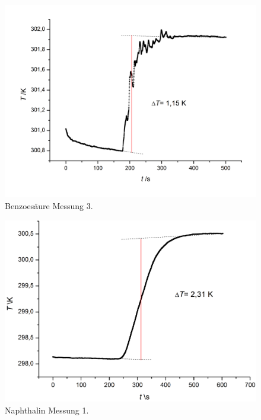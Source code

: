\documentclass[12pt,a4paper,titlepage,headinclude,bibtotoc]{scrartcl}
\begin{document}
\begin{figure} [h!]
\begin{center}
\includegraphics[scale=0.45]{Benz3.png} \end{center}
\caption{Benzoesäure Messung 3.}
\end{figure}

\begin{figure} [h!]
\begin{center}
\includegraphics[scale=0.45]{Napht1.png} \end{center}
\caption{Naphthalin Messung 1.}
\end{figure}
\end{document}
